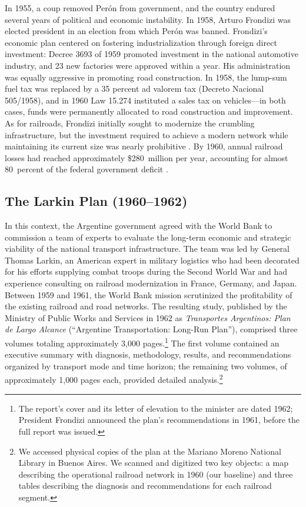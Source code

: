In 1955, a coup removed Perón from government, and the country
endured several years of political and economic instability. In 1958,
Arturo Frondizi was elected president in an election from which Perón
was banned. Frondizi's economic plan centered on fostering
industrialization through foreign direct investment: Decree 3693 of
1959 promoted investment in the national automotive industry, and 23
new factories were approved within a year. His administration was
equally aggressive in promoting road construction. In 1958, the
lump-sum fuel tax was replaced by a 35 percent ad valorem tax
(Decreto Nacional 505/1958), and in 1960 Law 15.274 instituted a
sales tax on vehicles—in both cases, funds were permanently allocated
to road construction and improvement. As for railroads, Frondizi
initially sought to modernize the crumbling infrastructure, but the
investment required to achieve a modern network while maintaining its
current size was nearly prohibitive \citep{lopez_waddell2007}. By
1960, annual railroad losses had reached approximately \$280~million
per year, accounting for almost 80~percent of the federal government
deficit \citep{keeling1993}.

\subsection{The Larkin Plan (1960--1962)}
\label{ssec:larkin}

In this context, the Argentine government agreed with the World Bank
to commission a team of experts to evaluate the long-term economic
and strategic viability of the national transport infrastructure. The
team was led by General Thomas Larkin, an American expert in military
logistics who had been decorated for his efforts supplying combat
troops during the Second World War and had experience consulting on
railroad modernization in France, Germany, and Japan. Between 1959
and 1961, the World Bank mission scrutinized the profitability of the
existing railroad and road networks. The resulting study, published
by the Ministry of Public Works and Services in 1962 as
\emph{Transportes Argentinos: Plan de Largo Alcance} (``Argentine
Transportation: Long-Run Plan''), comprised three volumes totaling
approximately 3{,}000 pages.\footnote{The report's cover and its
letter of elevation to the minister are dated 1962; President
Frondizi announced the plan's recommendations in 1961, before the
full report was issued.} The first volume contained an executive summary with
diagnosis, methodology, results, and recommendations organized by
transport mode and time horizon; the remaining two volumes, of
approximately 1{,}000 pages each, provided detailed
analysis.\footnote{We accessed physical copies of the plan at the
Mariano Moreno National Library in Buenos Aires. We scanned and
digitized two key objects: a map describing the operational railroad
network in 1960 (our baseline) and three tables describing the
diagnosis and recommendations for each railroad segment.}

